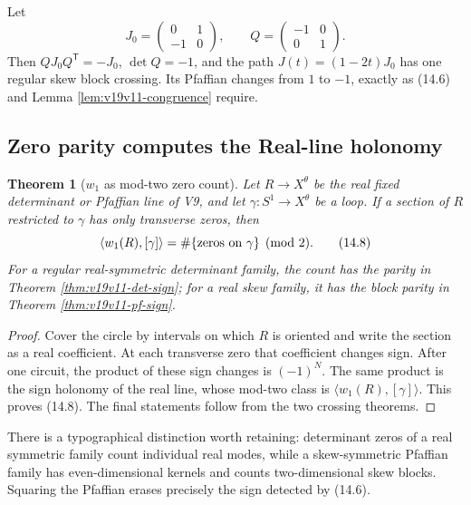 \documentclass[11pt]{article}
\newtheorem{theorem}{Theorem}[section]
\theoremstyle{remark}
\begin{document}
\begin{example}
\label{ex:v19v11-one-crossing}
Let
\[
 J_0=\begin{pmatrix}0&1\\-1&0\end{pmatrix},\qquad
 Q=\begin{pmatrix}-1&0\\0&1\end{pmatrix}.
\]
Then \(QJ_0Q^{\mathsf T}=-J_0\), \(\det Q=-1\), and the path
\(J(t)=(1-2t)J_0\) has one regular skew block crossing.  Its Pfaffian
changes from \(1\) to \(-1\), exactly as (14.6) and Lemma
\ref{lem:v19v11-congruence} require.
\end{example}

\subsection{Zero parity computes the Real-line holonomy}

\begin{theorem}[\(w_1\) as mod-two zero count]
\label{thm:v19v11-w1}
Let \(R\to X^\theta\) be the real fixed determinant or Pfaffian line
of V9, and let \(\gamma:S^1\to X^\theta\) be a loop.  If a section of
\(R\) restricted to \(\gamma\) has only transverse zeros, then
\[
 \left\langle w_1(R),[\gamma]\right\rangle
 =\#\{\hbox{zeros on }\gamma\}\pmod2.                          \tag{14.8}
\]
For a regular real-symmetric determinant family, the count has the parity
in Theorem \ref{thm:v19v11-det-sign}; for a real skew family, it has the
block parity in Theorem \ref{thm:v19v11-pf-sign}.
\end{theorem}

\begin{proof}
Cover the circle by intervals on which \(R\) is oriented and write the
section as a real coefficient.  At each transverse zero that coefficient
changes sign.  After one circuit, the product of these sign changes is
\((-1)^N\).  The same product is the sign holonomy of the real line, whose
mod-two class is \(\langle w_1(R),[\gamma]\rangle\).  This proves (14.8).
The final statements follow from the two crossing theorems.
\end{proof}

There is a typographical distinction worth retaining: determinant zeros
of a real symmetric family count individual real modes, while a
skew-symmetric Pfaffian family has even-dimensional kernels and counts
two-dimensional skew blocks.  Squaring the Pfaffian erases precisely the
sign detected by (14.6).
\end{document}
